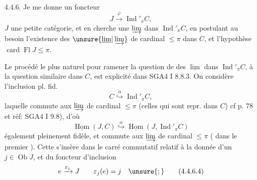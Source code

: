 
4.4.6. Je me donne un foncteur
\[
J\xrightarrow{\varphi}\operatorname{Ind}'_{\pi}C,\tag*{(4.4.6.1)}
\]
$J$ une petite catégorie, et en cherche une $\varinjlim$ dans $\operatorname{Ind}'_{\pi}C$, en postulant au besoin l'existence des $\unsure{\underline{\lim}|\varinjlim}$ de cardinal $\leq\pi$ dans $C$, et l'hypothèse $\operatorname{card}\operatorname{Fl}J\leq\pi$.

Le procédé le plus naturel pour ramener la question de  des $\underline{\lim}$ dans $\operatorname{Ind}'_{\pi}C$, à la question similaire dans $C$, est explicité dans SGA4 I 8.8.3. On considère l'inclusion pl. fid.
\[
C\overset{\alpha}{\hookrightarrow}\operatorname{Ind}'_{\pi}C,\tag*{(4.4.6.2)}
\]
laquelle commute aux $\varinjlim$ de cardinal $\leq\pi$ (celles qui sont repr. dans $C$) cf p. 78 et réf: SGA4 I 9.8), d'où
\[
\underline{\operatorname{Hom}}(J,C)\overset{\alpha}{\hookrightarrow}\underline{\operatorname{Hom}}(J,\operatorname{Ind}'_{\pi}C)\tag*{(4.4.6.3)}
\]
également pleinement fidèle, et commute aux $\varinjlim$ de cardinal $\leq\pi$ ( dans le premier ). Cette  s'insère dans le carré commutatif relatif à la donnée d'un $j\in\operatorname{Ob}J$, et du foncteur d'inclusion
\[
e\xrightarrow{\varepsilon_j}J\qquad\varepsilon_j(e)=j\quad\unsure{;}\tag*{(4.4.6.4)}
\]
